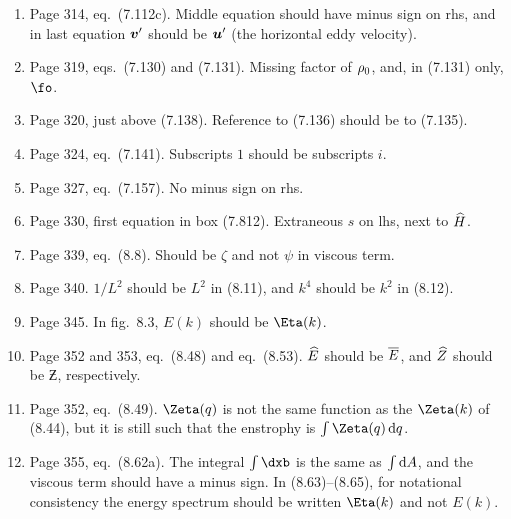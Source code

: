 \documentclass[10pt]{article}
\newcommand{\eq}{eq.\ } \newcommand{\Eq}{Eq.\ }
\begin{document}
\begin{enumerate}
\item Page 314, \eq (7.112c). Middle equation should have minus sign on rhs, and in last equation ${\bm {v}}'$ should be ${\bm {u}}'$ (the horizontal eddy velocity).


\item Page 319, eqs.\ (7.130) and (7.131). Missing factor of $\rho_0$, and, in (7.131) only, $\fo$.

\item Page 320, just above (7.138). Reference to (7.136) should be to (7.135).

\item Page 324, \eq (7.141). Subscripts $1$ should be subscripts $i$. 


\item Page 327, \eq (7.157). No minus sign on rhs.

\item Page 330, first equation in box (7.812). Extraneous $s$ on lhs, next to $\widehat H$.

\item Page 339, \eq (8.8). Should be $\zeta$ and not $\psi$ in viscous term. 


\item Page 340. $1/L^2$ should be $L^2$ in (8.11), and $k^4$ should be $k^2$ in (8.12).

\item Page 345. In fig.\ 8.3, $E(k)$ should be $\Eta(k)$.

\item Page 352 and 353, \eq (8.48) and \eq (8.53). $\widehat E$ should be $\overline E$, and $\widehat Z$ should be $\Zbar$, respectively.

\item Page 352, \eq (8.49).  $\Zeta(q)$ is not the same function as the $\Zeta(k)$ of (8.44), but it is still such that the enstrophy is $\int \Zeta(q) \, \d q$. 

\item Page 355, \eq (8.62a). The integral $\int \dxb$ is the same as $\int \mathrm{d} A$, and the viscous term should have a minus sign. In (8.63)--(8.65), for notational consistency the energy spectrum should be written $\Eta(k)$ and not $E(k)$.


\end{enumerate}
\end{document}
